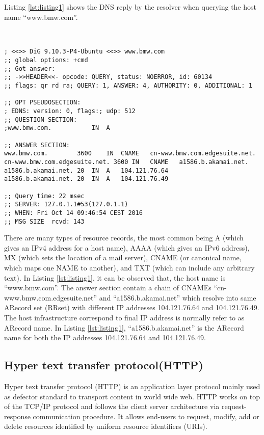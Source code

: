 \noindent Listing \ref{lst:listing1} shows the DNS reply by the resolver when querying 
the host name \enquote{www.bmw.com}.\\\\

\begin{lstlisting}[caption= DNS Reply for a host using dig command line tool, label=lst:listing1]

; <<>> DiG 9.10.3-P4-Ubuntu <<>> www.bmw.com
;; global options: +cmd
;; Got answer:
;; ->>HEADER<<- opcode: QUERY, status: NOERROR, id: 60134
;; flags: qr rd ra; QUERY: 1, ANSWER: 4, AUTHORITY: 0, ADDITIONAL: 1

;; OPT PSEUDOSECTION:
; EDNS: version: 0, flags:; udp: 512
;; QUESTION SECTION:
;www.bmw.com.			IN	A

;; ANSWER SECTION:
www.bmw.com.		3600	IN	CNAME	cn-www.bmw.com.edgesuite.net.
cn-www.bmw.com.edgesuite.net. 3600 IN	CNAME	a1586.b.akamai.net.
a1586.b.akamai.net.	20	IN	A	104.121.76.64
a1586.b.akamai.net.	20	IN	A	104.121.76.49

;; Query time: 22 msec
;; SERVER: 127.0.1.1#53(127.0.1.1)
;; WHEN: Fri Oct 14 09:46:54 CEST 2016
;; MSG SIZE  rcvd: 143
\end{lstlisting}



\noindent There are many types of resource records, the most common being A (which gives an IPv4 address for a host name), AAAA (which gives an IPv6 address), MX (which sets the location of a mail server), CNAME (or canonical name, which maps one NAME to another), and TXT (which can include any arbitrary text). In Listing \ref{lst:listing1}, it can be observed that, the host name is \enquote{www.bmw.com}. The answer section contain a chain of CNAMEs \enquote{cn-www.bmw.com.edgesuite.net} and \enquote{a1586.b.akamai.net} which resolve into same ARecord set (RRset) with different IP addresses 104.121.76.64 and 104.121.76.49. The host infrastructure correspond to final IP address is normally refer to as ARecord name. In Listing \ref{lst:listing1}, \enquote{a1586.b.akamai.net} is the ARecord name for both the IP addresses  104.121.76.64 and  104.121.76.49.\\

\subsection{Hyper text transfer protocol(HTTP)}
\noindent Hyper text transfer protocol (HTTP) \cite{RISTOL} \cite{RISTOL1} is an application layer protocol mainly used as defector standard to transport content in world wide web. HTTP works on top
of the TCP/IP protocol and follows the client server architecture via request-response communication procedure. It allows end-users to request, modify, add or delete resources identified by uniform resource identifiers (URIs).\\

